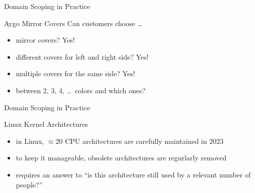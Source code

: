 
\begin{frame}{Domain Scoping in Practice}
	\begin{mycolumns}[widths={70},animation=none]
		\centering{}
	\mynextcolumn
		\begin{example}{Aygo Mirror Covers}
			Can customers choose \ldots
			\begin{itemize}
				\item mirror covers? Yes!
				\item different covers for left and right side? Yes!
				\item multiple covers for the same side? Yes!
				\item between 2, 3, 4, \ldots\ colors and which ones?
			\end{itemize}
		\end{example}
	\end{mycolumns}
\end{frame}

\begin{frame}{Domain Scoping in Practice}
	\begin{mycolumns}[widths={70},animation=none]
		\centering{}
	\mynextcolumn
		\begin{example}{Linux Kernel Architectures}
			\begin{itemize}
				\item in Linux, $\approx 20$ CPU architectures are carefully maintained in 2023
				\item to keep it manageable, obsolete architectures are regurlarly removed
				\item requires an answer to ``is this architecture still used by a relevant number of people?''
			\end{itemize}
		\end{example}
	\end{mycolumns}
\end{frame}


